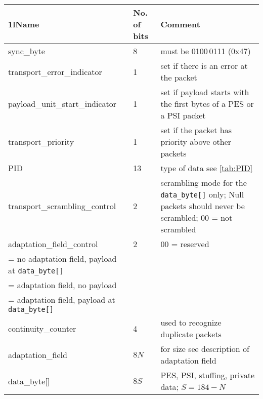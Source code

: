 \documentclass{scrartcl}
\providecommand*\toprule{\hline}
\providecommand*\midrule{\hline}
\providecommand*\bottomrule{\hline}
\begin{document}
\begin{table}\small
  \centering
  \begin{tabularx}{\textwidth}{>{\ttfamily}ll>{\raggedright}X}
    \toprule
    \multicolumn1l{Name} & No. of bits & Comment \tabularnewline
    \midrule
    sync\_byte                    &  8 & must be 0100\,0111 (0x47) 
                                        \tabularnewline
    transport\_error\_indicator  &  1 & set if there is an error at the packet
                                        \tabularnewline
    payload\_unit\_start\_indicator &  1 & set if payload starts with the first
                                        bytes of a PES or a PSI packet
                                        \tabularnewline
    transport\_priority          &  1 & set if the packet has priority above
                                        other packets\tabularnewline
    PID                          & 13 & type of data see \autoref{tab:PID}
                                        \tabularnewline
    transport\_scrambling\_control &  2 & scrambling mode for the
                                        \texttt{data\_byte[]} only; 
                                        Null packets should never be
                                        scrambled; 00 = not scrambled
                                        \tabularnewline
    adaptation\_field\_control   &  2 & 00 = reserved\\
                                        01 = no adaptation field, payload at
                                        \texttt{data\_byte[]}\\
                                        10 = adaptation field, no payload\\
                                        11 = adaptation field, payload at
                                        \texttt{data\_byte[]}
                                        \tabularnewline
    continuity\_counter          &  4 & used to recognize duplicate packets
                                        \tabularnewline
    adaptation\_field            &$8N$& for size see description of adaptation
                                        field
                                        \tabularnewline
    data\_byte[]                 &$8S$& PES, PSI, stuffing, private data;
                                        $S = 184 - N$
                                        \tabularnewline
    \bottomrule
  \end{tabularx}
  \label{tab:ts-general}
\end{table}
\end{document}
